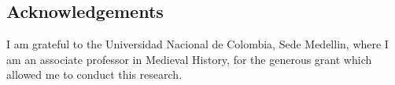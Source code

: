 \begin{paper}
\section*{Acknowledgements}
I am grateful to the Universidad  Nacional de Colombia, Sede Medellin, where I am an associate professor in Medieval History, for the generous grant which allowed me to conduct this research.

\begin{flushleft}
    \renewcommand*{\mkbibnamefamily}[1]{\textsc{#1}}
    \renewcommand*{\mkbibnamegiven}[1]{\textsc{#1}} 
\printbibliography
\end{flushleft}

\end{paper}